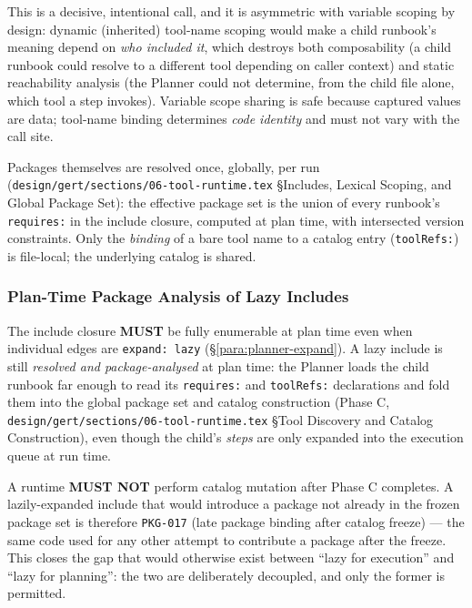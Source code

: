 This is a decisive, intentional call, and it is asymmetric with variable
scoping by design: dynamic (inherited) tool-name scoping would make a child
runbook's meaning depend on \emph{who included it}, which destroys both
composability (a child runbook could resolve to a different tool depending
on caller context) and static reachability analysis (the Planner could not
determine, from the child file alone, which tool a step invokes). Variable
scope sharing is safe because captured values are data; tool-name binding
determines \emph{code identity} and must not vary with the call site.

Packages themselves are resolved once, globally, per run
(\texttt{design/gert/sections/06-tool-runtime.tex}
\S Includes, Lexical Scoping, and Global Package Set): the effective package
set is the union of every runbook's \texttt{requires:} in the include
closure, computed at plan time, with intersected version constraints. Only
the \emph{binding} of a bare tool name to a catalog entry
(\texttt{toolRefs:}) is file-local; the underlying catalog is shared.

\subsubsection*{Plan-Time Package Analysis of Lazy Includes}
\label{sec:include-lazy-package-analysis}

The include closure \textbf{MUST} be fully enumerable at plan time even when
individual edges are \texttt{expand: lazy}
(\S\ref{para:planner-expand}). A lazy include is still \emph{resolved and
package-analysed} at plan time: the Planner loads the child runbook far
enough to read its \texttt{requires:} and \texttt{toolRefs:} declarations
and fold them into the global package set and catalog construction
(Phase C, \texttt{design/gert/sections/06-tool-runtime.tex}
\S Tool Discovery and Catalog Construction), even though the child's
\emph{steps} are only expanded into the execution queue at run time.

A runtime \textbf{MUST NOT} perform catalog mutation after Phase C
completes. A lazily-expanded include that would introduce a package not
already in the frozen package set is therefore \texttt{PKG-017} (late
package binding after catalog freeze) --- the same code used for any other
attempt to contribute a package after the freeze. This closes the gap that
would otherwise exist between ``lazy for execution'' and ``lazy for
planning'': the two are deliberately decoupled, and only the former is
permitted.

